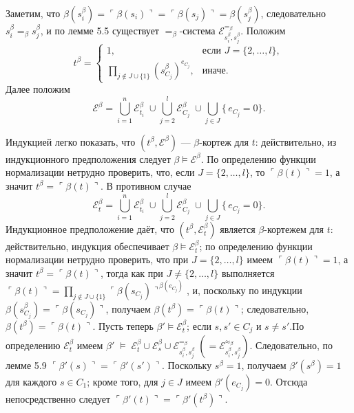 Заметим, что
$\beta(s_i^{\beta})=\ulcorner\beta(s_i)\urcorner
                    =\ulcorner\beta(s_j)\urcorner
                    =\beta(s_j^{\beta})$,
следовательно $s_i^{\beta}=_{\beta}s_j^{\beta}$,
и по лемме 5.5 существует $=_{\beta}$-система
$\mathcal E_{s_i^{\beta},s_j^{\beta}}^{=_{\beta}}$.
Положим
\[
  t^{\beta}=
  \begin{cases}
    1, & \text{если }J=\{2,\dots,l\},\\[4pt]
    \displaystyle\prod_{j\notin J\cup\{1\}}
       (s_{C_j}^{\beta})^{e_{C_j}}, & \text{иначе}.
  \end{cases}
\]
Далее положим
\[
  \mathcal E^{\beta}=
      \bigcup_{i=1}^{n}\mathcal E_{t_i}^{\beta}\;\cup
      \bigcup_{j=2}^{l}\mathcal E_{C_j}^{\beta}\;\cup
      \bigcup_{j\in J}\{\,e_{C_j}=0\}.
\]

Индукцией легко показать, что $(t^{\beta},\mathcal E^{\beta})$ —
$\beta$-кортеж для $t$: действительно,
из индукционного предположения следует $\beta\models\mathcal E^{\beta}$.
По определению функции нормализации нетрудно проверить, что,
если $J=\{2,\dots,l\}$, то $\ulcorner\beta(t)\urcorner=1$,
а значит $t^{\beta}= \ulcorner\beta(t)\urcorner$.
В противном случае
\[
  \mathcal E_{t}^{\beta}
  =\bigcup_{i=1}^{n}\mathcal E_{t_i}^{\beta}\;
   \cup\!
   \bigcup_{j=2}^{l}\mathcal E_{C_j}^{\beta}\;
   \cup\!
   \bigcup_{j\in J}\{\,e_{C_j}=0\}.
\]
Индукционное предположение даёт, что $(t^{\beta},\mathcal E_{t}^{\beta})$ является $\beta$-кортежем для $t$: действительно, индукция обеспечивает $\beta\models\mathcal E_{t}^{\beta}$; по определению функции нормализации нетрудно проверить, что при $J=\{2,\dots,l\}$ имеем $\ulcorner\beta(t)\urcorner=1$, а значит $t^{\beta}=\ulcorner\beta(t)\urcorner$, тогда как при $J\ne\{2,\dots,l\}$ выполняется $\ulcorner\beta(t)\urcorner=\prod_{j\notin J\cup\{1\}}\ulcorner\beta(s_{C_{j}})\urcorner^{\,\beta(e_{C_{j}})}$, и, поскольку по индукции $\beta(s_{C_{j}}^{\beta})=\ulcorner\beta(s_{C_{j}})\urcorner$, получаем $\beta(t^{\beta})=\ulcorner\beta(t)\urcorner$; следовательно, $\beta(t^{\beta})=\ulcorner\beta(t)\urcorner$. Пусть теперь $\beta'\models\mathcal E_{t}^{\beta}$; если $s,s'\in C_{j}$ и $s\ne s'$.По определению $\mathcal E_{t}^{\beta}$ имеем
\(
  \beta'\;\models\;
  \mathcal E_{t}^{\beta}\cup
  \mathcal E_{s}^{\beta}\cup
  \mathcal E_{s_i^{\beta},s_j^{\beta}}^{=_{\beta}}
  \;(=\mathcal E_{s_i^{\beta},s_j^{\beta}}^{\approx_{\beta}}).
\)
Следовательно, по лемме 5.9
$\ulcorner\beta'(s)\urcorner=\ulcorner\beta'(s')\urcorner$.
Поскольку $s^{\beta}=1$, получаем $\beta'(s^{\beta})=1$
для каждого $s\in C_{1}$; кроме того, для $j\in J$ имеем
$\beta'(e_{C_j})=0$.
Отсюда непосредственно следует
$\ulcorner\beta'(t)\urcorner=\ulcorner\beta'(t^{\beta})\urcorner$.

